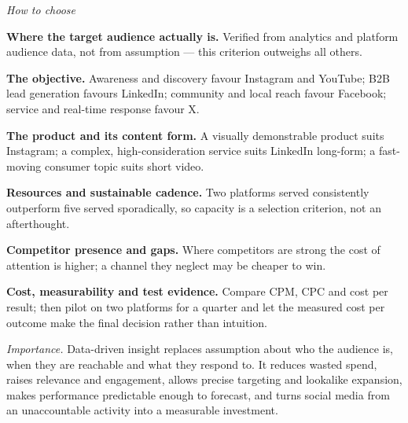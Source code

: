 \begin{qlist}
\textit{How to choose}
\begin{apts}\setcounter{enumi}{4}
\item \textbf{Where the target audience actually is.} Verified from analytics
      and platform audience data, not from assumption --- this criterion
      outweighs all others.
\item \textbf{The objective.} Awareness and discovery favour Instagram and
      YouTube; B2B lead generation favours LinkedIn; community and local reach
      favour Facebook; service and real-time response favour X.
\item \textbf{The product and its content form.} A visually demonstrable
      product suits Instagram; a complex, high-consideration service suits
      LinkedIn long-form; a fast-moving consumer topic suits short video.
\item \textbf{Resources and sustainable cadence.} Two platforms served
      consistently outperform five served sporadically, so capacity is a
      selection criterion, not an afterthought.
\item \textbf{Competitor presence and gaps.} Where competitors are strong the
      cost of attention is higher; a channel they neglect may be cheaper to win.
\item \textbf{Cost, measurability and test evidence.} Compare CPM, CPC and cost
      per result; then pilot on two platforms for a quarter and let the
      measured cost per outcome make the final decision rather than intuition.
\end{apts}

\textit{Importance.} Data-driven insight replaces assumption about who the
audience is, when they are reachable and what they respond to. It reduces wasted
spend, raises relevance and engagement, allows precise targeting and lookalike
expansion, makes performance predictable enough to forecast, and turns social
media from an unaccountable activity into a measurable investment.


\end{qlist}
